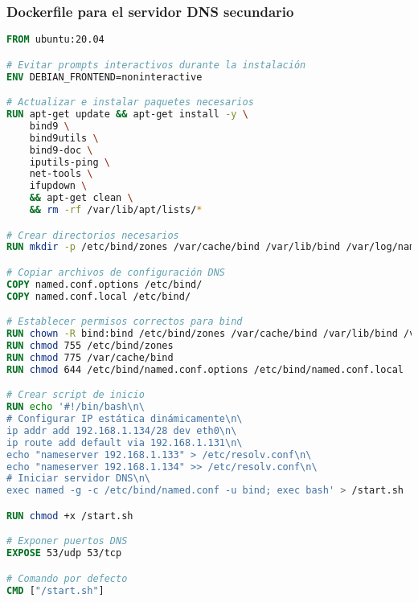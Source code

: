 \subsubsection{Dockerfile para el servidor DNS secundario}
\label{Apendice2:dockerfile_dns_secundario}
\begin{lstlisting}[language=Dockerfile]
FROM ubuntu:20.04

# Evitar prompts interactivos durante la instalación
ENV DEBIAN_FRONTEND=noninteractive

# Actualizar e instalar paquetes necesarios
RUN apt-get update && apt-get install -y \
    bind9 \
    bind9utils \
    bind9-doc \
    iputils-ping \
    net-tools \
    ifupdown \
    && apt-get clean \
    && rm -rf /var/lib/apt/lists/*

# Crear directorios necesarios
RUN mkdir -p /etc/bind/zones /var/cache/bind /var/lib/bind /var/log/named

# Copiar archivos de configuración DNS
COPY named.conf.options /etc/bind/
COPY named.conf.local /etc/bind/

# Establecer permisos correctos para bind
RUN chown -R bind:bind /etc/bind/zones /var/cache/bind /var/lib/bind /var/log/named
RUN chmod 755 /etc/bind/zones
RUN chmod 775 /var/cache/bind
RUN chmod 644 /etc/bind/named.conf.options /etc/bind/named.conf.local

# Crear script de inicio
RUN echo '#!/bin/bash\n\
# Configurar IP estática dinámicamente\n\
ip addr add 192.168.1.134/28 dev eth0\n\
ip route add default via 192.168.1.131\n\
echo "nameserver 192.168.1.133" > /etc/resolv.conf\n\
echo "nameserver 192.168.1.134" >> /etc/resolv.conf\n\
# Iniciar servidor DNS\n\
exec named -g -c /etc/bind/named.conf -u bind; exec bash' > /start.sh

RUN chmod +x /start.sh

# Exponer puertos DNS
EXPOSE 53/udp 53/tcp

# Comando por defecto
CMD ["/start.sh"] 
\end{lstlisting}

